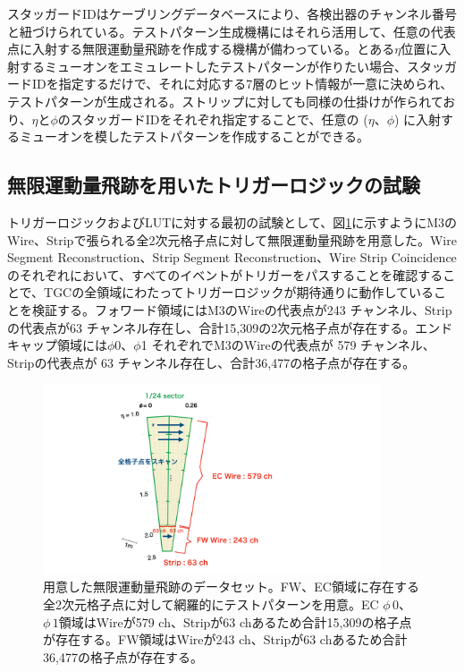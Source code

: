 
スタッガードIDはケーブリングデータベースにより、各検出器のチャンネル番号と紐づけられている。テストパターン生成機構にはそれら活用して、任意の代表点に入射する無限運動量飛跡を作成する機構が備わっている。とある$\eta$位置に入射するミューオンをエミュレートしたテストパターンが作りたい場合、スタッガードIDを指定するだけで、それに対応する7層のヒット情報が一意に決められ、テストパターンが生成される。ストリップに対しても同様の仕掛けが作られており、$\eta$と$\phi$のスタッガードIDをそれぞれ指定することで、任意の ($\eta$、$\phi$) に入射するミューオンを模したテストパターンを作成することができる。


\subsection{無限運動量飛跡を用いたトリガーロジックの試験}
トリガーロジックおよびLUTに対する最初の試験として、図\ref{InfMomentum}に示すようにM3のWire、Stripで張られる全2次元格子点に対して無限運動量飛跡を用意した。Wire Segment Reconstruction、Strip Segment Reconstruction、Wire Strip Coincidenceのそれぞれにおいて、すべてのイベントがトリガーをパスすることを確認することで、TGCの全領域にわたってトリガーロジックが期待通りに動作していることを検証する。フォワード領域にはM3のWireの代表点が243 チャンネル、Stripの代表点が63 チャンネル存在し、合計15,309の2次元格子点が存在する。エンドキャップ領域には$\phi$0、$\phi$1 それぞれでM3のWireの代表点が 579 チャンネル、Stripの代表点が 63 チャンネル存在し、合計36,477の格子点が存在する。

\begin{figure} 
\centering
\includegraphics[width=10cm]{fig/Test/InfMomentum.pdf}
\caption[用意した無限運動量飛跡のデータセット]{用意した無限運動量飛跡のデータセット。FW、EC領域に存在する全2次元格子点に対して網羅的にテストパターンを用意。EC $\phi\,0$、$\phi\,1$領域はWireが579 ch、Stripが63 chあるため合計15,309の格子点が存在する。FW領域はWireが243 ch、Stripが63 chあるため合計36,477の格子点が存在する。}
\label{InfMomentum}
\end{figure}

